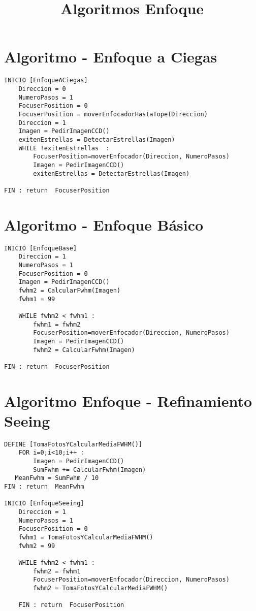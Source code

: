 \documentclass{article}
\title{Algoritmos Enfoque}
\begin{document}
\maketitle

\section{Algoritmo - Enfoque  a Ciegas }

\begin{verbatim}
INICIO [EnfoqueACiegas]
    Direccion = 0
    NumeroPasos = 1
    FocuserPosition = 0
    FocuserPosition = moverEnfocadorHastaTope(Direccion)
    Direccion = 1
    Imagen = PedirImagenCCD()
    exitenEstrellas = DetectarEstrellas(Imagen)
    WHILE !exitenEstrellas  :
        FocuserPosition=moverEnfocador(Direccion, NumeroPasos)
        Imagen = PedirImagenCCD()
        exitenEstrellas = DetectarEstrellas(Imagen)
        
FIN : return  FocuserPosition    
\end{verbatim} 


\section{Algoritmo - Enfoque  Básico }

\begin{verbatim}
INICIO [EnfoqueBase]
    Direccion = 1
    NumeroPasos = 1
    FocuserPosition = 0
    Imagen = PedirImagenCCD()
    fwhm2 = CalcularFwhm(Imagen)
    fwhm1 = 99
    
    WHILE fwhm2 < fwhm1 :
        fwhm1 = fwhm2
        FocuserPosition=moverEnfocador(Direccion, NumeroPasos)
        Imagen = PedirImagenCCD()
        fwhm2 = CalcularFwhm(Imagen)
        
FIN : return  FocuserPosition    
\end{verbatim} 

\newpage
\section{Algoritmo Enfoque  - Refinamiento Seeing }

\begin{verbatim}
DEFINE [TomaFotosYCalcularMediaFWHM()]
    FOR i=0;i<10;i++ :  
        Imagen = PedirImagenCCD()
        SumFwhm += CalcularFwhm(Imagen)
   MeanFwhm = SumFwhm / 10
FIN : return  MeanFwhm

INICIO [EnfoqueSeeing]
    Direccion = 1
    NumeroPasos = 1
    FocuserPosition = 0
    fwhm1 = TomaFotosYCalcularMediaFWHM()
    fwhm2 = 99
    
    WHILE fwhm2 < fwhm1 :
        fwhm2 = fwhm1
        FocuserPosition=moverEnfocador(Direccion, NumeroPasos)
        fwhm2 = TomaFotosYCalcularMediaFWHM()
        
    FIN : return  FocuserPosition 


\end{verbatim}
\end{document}
